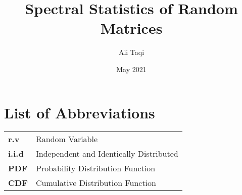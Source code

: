 \documentclass[12pt,twoside]{reedthesis}
\title{Spectral Statistics of Random Matrices}
\author{Ali Taqi}
\date{May 2021}
\begin{document}
  \maketitle
  \frontmatter %
  \pagestyle{empty} %



    \chapter*{List of Abbreviations}

	\begin{table}[h]
	\centering %
	\begin{tabular}{ll}
		\textbf{r.v}  	  &  Random Variable \\
		\textbf{i.i.d}  	&  Independent and Identically Distributed \\
		\textbf{PDF}      &  Probability Distribution Function \\
		\textbf{CDF}      &  Cumulative Distribution Function \\
		\end{tabular}
	\end{table}

    \tableofcontents

    \listoftables \hfill

    \begin{center}

    \Ddisttable \newline

    \hfill \vspace{2em}

    \spectrumschemetable \newline

    \hfill \vspace{2em}

    \dispersiontable \newline

    \hfill \vspace{2em}

    \pairingschemetable \newline

    \end{center}
\end{document}
